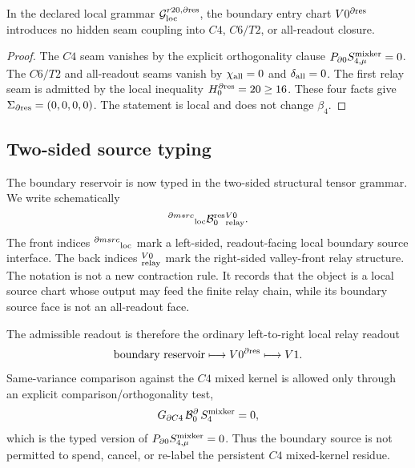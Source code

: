 \begin{lemma}
\label{lem:v470-r21-boundary-seam-audit}
In the declared local grammar \(\mathcal G_{\rm loc}^{r20,\partial{\rm res}}\),
the boundary entry chart \(V0^{\partial{\rm res}}\) introduces no hidden seam
coupling into \(C4\), \(C6/T2\), or all-readout closure.
\end{lemma}

\begin{proof}
The \(C4\) seam vanishes by the explicit orthogonality clause
\(P_{\partial0}S_{4,\mu}^{\rm mixker}=0\).  The \(C6/T2\) and all-readout seams
vanish by \(\chi_{\rm all}=0\) and \(\delta_{\rm all}=0\).  The first relay seam
is admitted by the local inequality \(H_0^{\partial{\rm res}}=20\ge16\).  These
four facts give \(\Sigma_{\partial{\rm res}}=(0,0,0,0)\).  The statement is
local and does not change \(\beta_4\).
\end{proof}

\subsection{Two-sided source typing}
\label{subsec:v470-r21-two-sided-source-typing}

The boundary reservoir is now typed in the two-sided structural tensor grammar.
We write schematically
\[
{}^{\partial{
m src}}{}_{\rm loc}\mathcal B_0^{\rm res}{}^{V0}_{\rm relay}.
\]
The front indices \({}^{\partial{
m src}}{}_{\rm loc}\) mark a left-sided,
readout-facing local boundary source interface.  The back indices
\({}^{V0}_{\rm relay}\) mark the right-sided valley-front relay structure.  The
notation is not a new contraction rule.  It records that the object is a local
source chart whose output may feed the finite relay chain, while its boundary
source face is not an all-readout face.

The admissible readout is therefore the ordinary left-to-right local relay
readout
\[
\text{boundary reservoir}
\longmapsto
V0^{\partial{\rm res}}
\longmapsto
V1.
\]
Same-variance comparison against the \(C4\) mixed kernel is allowed only through
an explicit comparison/orthogonality test,
\[
G_{\partial C4}\,\mathcal B_{0}^{\partial}\,S_{4}^{\rm mixker}=0,
\]
which is the typed version of \(P_{\partial0}S_{4,\mu}^{\rm mixker}=0\).  Thus the
boundary source is not permitted to spend, cancel, or re-label the persistent
\(C4\) mixed-kernel residue.

